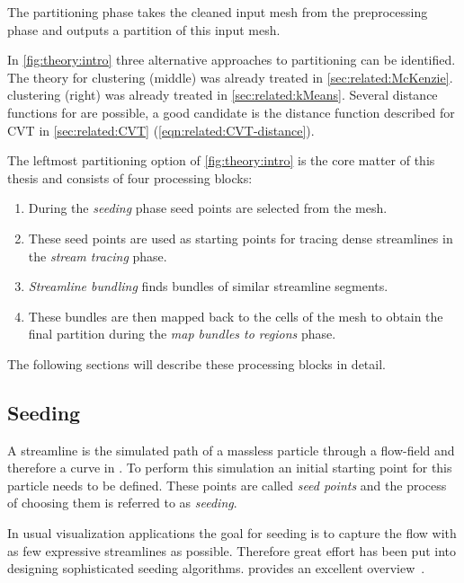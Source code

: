 The partitioning phase takes the cleaned input mesh from the preprocessing phase and outputs a partition of this input mesh.

In \autoref{fig:theory:intro} three alternative approaches to partitioning can be identified.
The theory for  clustering (middle) was already treated in \autoref{sec:related:McKenzie}.
\kMeans clustering (right) was already treated in \autoref{sec:related:kMeans}. Several distance functions for \kMeans are possible, a good candidate is the distance function described for \ac{CVT} in \autoref{sec:related:CVT} (\autoref{eqn:related:CVT-distance}).

The leftmost partitioning option of \autoref{fig:theory:intro} is the core matter of this thesis and consists of four processing blocks:
\begin{enumerate}
  \item During the \emph{seeding} phase seed points are selected from the mesh.
  
  \item These seed points are used as starting points for tracing dense streamlines in the \emph{stream tracing} phase.
  
  \item \emph{Streamline bundling} finds bundles of similar streamline segments.
  
  \item These bundles are then mapped back to the cells of the \threed mesh to obtain the final partition during the \emph{map bundles to regions} phase.
\end{enumerate}

The following sections will describe these processing blocks in detail.


\subsection{Seeding}

A streamline is the simulated path of a massless particle through a flow-field and therefore a curve in \threed. To perform this simulation an initial starting point for this particle needs to be defined. These points are called \emph{seed points} and the process of choosing them is referred to as \emph{seeding}.

In usual visualization applications the goal for seeding is to capture the flow with as few expressive streamlines as possible. Therefore great effort has been put into designing sophisticated seeding algorithms.  provides an excellent overview~\cite{McLoughlin}.

